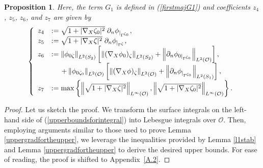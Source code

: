 \documentclass[11pt]{article}
\newtheorem{proposition}[theorem]{Proposition}
\begin{document}
\begin{proposition}
	Here, the term  $G_1$ is defined in (\ref{firstmajG1}) and  coefficients $z_4$, $z_5$, $z_6$, and $z_7$ are given by 
	\begin{equation}\label{z4toz9}
		\left\{
		\begin{array}{ll}
			z_4 &:= \sqrt{1+|\nabla_X\zeta_0|^2}\;\partial_n\phi_{|_{\Gamma^{\zeta_0}}}, \\
			z_5 &:= \sqrt{1+|\nabla_X\zeta|^2}\;\partial_n\phi_{|_{\Gamma^{\zeta}}},  \\
			z_6&:=  \left\Vert \phi_{0\zeta} \right\Vert_{L^2(S_2)}\left[  \left\Vert  (\nabla_X\phi_0)_{\zeta}\right\Vert_{L^2(S_2)}+ \left\Vert \partial_n\phi_{0|_{\Gamma^{\zeta_0}}} \right\Vert_{L^2(\mathcal O)} \right],\\
			&\hspace{0.5cm}+\left\Vert \phi_{0\zeta_0} \right\Vert_{L^2(\mathcal O)}\left[  \left\Vert  (\nabla_X\phi)_{\zeta}\right\Vert_{L^2(\mathcal O)}+ \left\Vert \partial_n\phi_{|_{\Gamma^{\zeta_0}}} \right\Vert_{L^2(S_1)} \right],\\
			z_7&:=   \max\left\{\left\Vert \sqrt{1+|\nabla_X\zeta|^2} \right\Vert_{L^{\infty}(\mathcal O)},\left\Vert \sqrt{1+|\nabla_X\zeta_0|^2} \right\Vert_{L^{\infty}(\mathcal O)}  \right\}.
		\end{array}
		\right.
	\end{equation}
	
\end{proposition}
\begin{proof} Let us sketch the proof. 
	We transform the surface integrals on the left-hand side of (\ref{upperboundsforintegral}) into Lebesgue integrals over $\mathcal O$. Then, employing arguments similar to those used to prove  Lemma \ref{uppergradfortheupper}, we leverage the inequalities provided by Lemma \ref{l1stab} and Lemma \ref{uppergradfortheupper} to derive the desired upper bounds. For ease of reading, the proof is shifted to Appendix~\ref{A.2}.
\end{proof}
\end{document}
